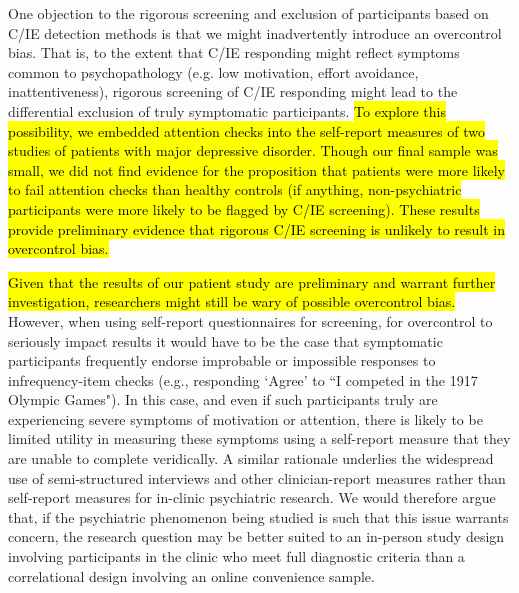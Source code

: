 \documentclass[a4paper,notitlepage,12pt]{article}
\begin{document}
\begin{refsection}[main]
One objection to the rigorous screening and exclusion of participants based on C/IE detection methods is that we might inadvertently introduce an overcontrol bias. That is, to the extent that C/IE responding might reflect symptoms common to psychopathology (e.g. low motivation, effort avoidance, inattentiveness), rigorous screening of C/IE responding might lead to the differential exclusion of truly symptomatic participants. \hl{To explore this possibility, we embedded attention checks into the self-report measures of two studies of patients with major depressive disorder. Though our final sample was small, we did not find evidence for the proposition that patients were more likely to fail attention checks than healthy controls (if anything, non-psychiatric participants were more likely to be flagged by C/IE screening). These results provide preliminary evidence that rigorous C/IE screening is unlikely to result in overcontrol bias.}

\hl{Given that the results of our patient study are preliminary and warrant further investigation, researchers might still be wary of possible overcontrol bias.} However, when using self-report questionnaires for screening, for overcontrol to seriously impact results it would have to be the case that symptomatic participants frequently endorse improbable or impossible responses to infrequency-item checks (e.g., responding `Agree' to ``I competed in the 1917 Olympic Games"). In this case, and even if such participants truly are experiencing severe symptoms of motivation or attention, there is likely to be limited utility in measuring these symptoms using a self-report measure that they are unable to complete veridically. A similar rationale underlies the widespread use of semi-structured interviews and other clinician-report measures rather than self-report measures for in-clinic psychiatric research. We would therefore argue that, if the psychiatric phenomenon being studied is such that this issue warrants concern, the research question may be better suited to an in-person study design involving participants in the clinic who meet full diagnostic criteria than a correlational design involving an online convenience sample.


\end{refsection}
\end{document}
